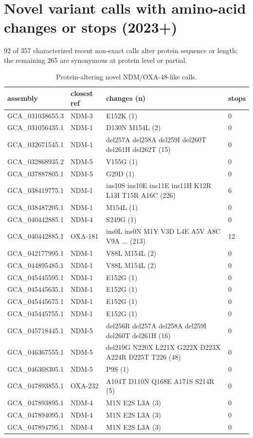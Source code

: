 \section{Novel variant calls with amino-acid changes or stops (2023+)}
92 of 357 characterized recent non-exact calls alter protein sequence or length; the remaining 265 are synonymous at protein level or partial.
\begin{longtable}{llll}
\caption{Protein-altering novel NDM/OXA-48-like calls.}\\
\textbf{assembly}&\textbf{closest ref}&\textbf{changes (n)}&\textbf{stops}\\\hline
\endhead
GCA\_031038655.3&NDM-3&E152K (1)&0\\
GCA\_031056435.1&NDM-1&D130N M154L (2)&0\\
GCA\_032671545.1&NDM-1&del257A del258A del259I del260T del261H del262T  (15)&0\\
GCA\_032868935.2&NDM-5&V155G (1)&0\\
GCA\_037887805.1&NDM-5&G29D (1)&0\\
GCA\_038419775.1&NDM-1&ins10S ins10E ins11E ins11H K12R L13I T15R A16C  (226)&6\\
GCA\_038487205.1&NDM-1&M154L (1)&0\\
GCA\_040442885.1&NDM-4&S249G (1)&0\\
GCA\_040442885.1&OXA-181&ins0L ins0N M1Y V3D L4E A5V A8C V9A ... (213)&12\\
GCA\_042177995.1&NDM-1&V88L M154L (2)&0\\
GCA\_044895485.1&NDM-1&V88L M154L (2)&0\\
GCA\_045445595.1&NDM-1&E152G (1)&0\\
GCA\_045445635.1&NDM-1&E152G (1)&0\\
GCA\_045445675.1&NDM-1&E152G (1)&0\\
GCA\_045445755.1&NDM-1&E152G (1)&0\\
GCA\_045718445.1&NDM-5&del256R del257A del258A del259I del260T del261H  (16)&0\\
GCA\_046367555.1&NDM-5&del219G N220X L221X G222X D223X A224R D225T T226 (48)&0\\
GCA\_046368305.1&NDM-5&P9S (1)&0\\
GCA\_047893855.1&OXA-232&A104T D110N Q168E A171S S214R (5)&0\\
GCA\_047893895.1&NDM-4&M1N E2S L3A (3)&0\\
GCA\_047894095.1&NDM-4&M1N E2S L3A (3)&0\\
GCA\_047894795.1&NDM-4&M1N E2S L3A (3)&0\\

\end{longtable}
